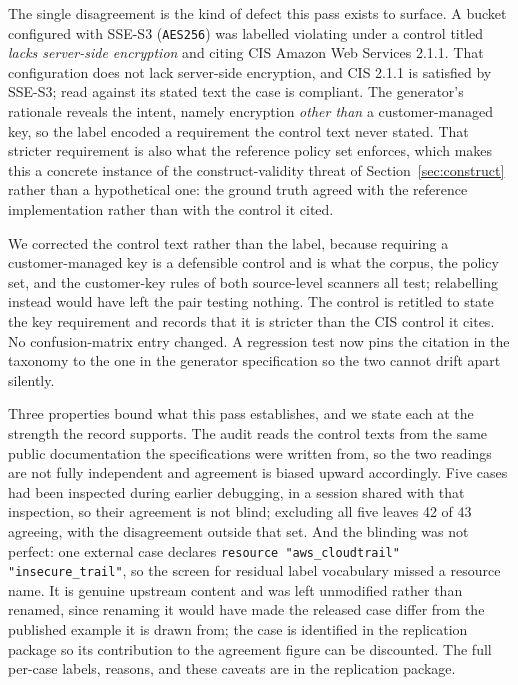 \documentclass[smallextended]{svjour3}
\begin{document}
The single disagreement is the kind of defect this pass exists to surface. A
bucket configured with SSE-S3 (\texttt{AES256}) was labelled violating under a
control titled \emph{lacks server-side encryption} and citing CIS Amazon Web
Services 2.1.1. That configuration does not lack server-side encryption, and CIS
2.1.1 is satisfied by SSE-S3; read against its stated text the case is compliant.
The generator's rationale reveals the intent, namely encryption \emph{other than}
a customer-managed key, so the label encoded a requirement the control text never
stated. That stricter requirement is also what the reference policy set enforces,
which makes this a concrete instance of the construct-validity threat of
Section~\ref{sec:construct} rather than a hypothetical one: the ground truth
agreed with the reference implementation rather than with the control it cited.

We corrected the control text rather than the label, because requiring a
customer-managed key is a defensible control and is what the corpus, the policy
set, and the customer-key rules of both source-level scanners all test;
relabelling instead would have left the pair testing nothing. The control is
retitled to state the key requirement and records that it is stricter than the
CIS control it cites. No confusion-matrix entry changed. A regression test now
pins the citation in the taxonomy to the one in the generator specification so
the two cannot drift apart silently.

Three properties bound what this pass establishes, and we state each at the
strength the record supports. The audit reads the control texts from the same
public documentation the specifications were written from, so the two readings
are not fully independent and agreement is biased upward accordingly. Five cases
had been inspected during earlier debugging, in a session shared with that
inspection, so their agreement is not blind; excluding all five leaves 42 of 43
agreeing, with the disagreement outside that set. And the blinding was not
perfect: one external case declares \texttt{resource "aws\_cloudtrail"
"insecure\_trail"}, so the screen for residual label vocabulary missed a
resource name. It is genuine upstream content and was left unmodified rather than
renamed, since renaming it would have made the released case differ from the
published example it is drawn from; the case is identified in the replication
package so its contribution to the agreement figure can be discounted. The full
per-case labels, reasons, and these caveats are in the replication package.
\end{document}
